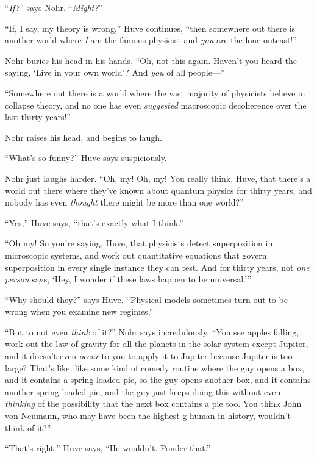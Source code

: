 {
 ``\textit{If?}'' says Nohr.
``\textit{Might?}''}

{
 ``If, I say, my theory is
wrong,'' Huve continues, ``then
somewhere out there is another world where \textit{I} am the famous
physicist and \textit{you} are the lone outcast!''}

{
 Nohr buries his head in his hands. ``Oh, not this
again. Haven't you heard the saying,
`Live in your own world'? And
\textit{you} of all people---''}

{
 ``Somewhere out there is a world where the vast
majority of physicists believe in collapse theory, and no one has even
\textit{suggested} macroscopic decoherence over the last thirty
years!''}

{
 Nohr raises his head, and begins to laugh.}

{
 ``What's so
funny?'' Huve says suspiciously.}

{
 Nohr just laughs harder. ``Oh, my! Oh, my! You
really think, Huve, that there's a world out there
where they've known about quantum physics for thirty
years, and nobody has even \textit{thought} there might be more than
one world?''}

{
 ``Yes,'' Huve says,
``that's exactly what I
think.''}

{
 ``Oh my! So you're saying, Huve,
that physicists detect superposition in microscopic systems, and work
out quantitative equations that govern superposition in every single
instance they can test. And for thirty years, not \textit{one person}
says, `Hey, I wonder if these laws happen to be
universal.'''}

{
 ``Why should they?'' says Huve.
``Physical models sometimes turn out to be wrong when
you examine new regimes.''}

{
 ``But to not even \textit{think} of
it?'' Nohr says incredulously. ``You
see apples falling, work out the law of gravity for all the planets in
the solar system except Jupiter, and it doesn't even
\textit{occur} to you to apply it to Jupiter because Jupiter is too
large? That's like, like some kind of comedy routine
where the guy opens a box, and it contains a spring-loaded pie, so the
guy opens another box, and it contains another spring-loaded pie, and
the guy just keeps doing this without even \textit{thinking} of the
possibility that the next box contains a pie too. You think John von
Neumann, who may have been the highest-g human in history,
wouldn't think of it?''}

{
 ``That's
right,'' Huve says, ``He
wouldn't. Ponder that.''}

